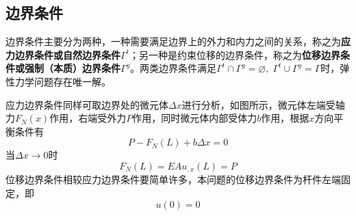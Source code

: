 \subsection{边界条件}
边界条件主要分为两种，一种需要满足边界上的外力和内力之间的关系，称之为\textbf{应力边界条件或自然边界条件}$\Gamma^t$；另一种是约束位移的边界条件，称之为\textbf{位移边界条件或强制（本质）边界条件}$\Gamma^g$。两类边界条件满足$\Gamma^t \cap \Gamma^g = \varnothing,\; \Gamma^t \cup \Gamma^g = \Gamma$时，弹性力学问题存在唯一解。\par
应力边界条件同样可取边界处的微元体$\Delta x$进行分析，如图所示，微元体左端受轴力$F_N(x)$作用，右端受外力$P$作用，同时微元体内部受体力$b$作用，根据$x$方向平衡条件有
\begin{equation}
P - F_N(L) + b \Delta x = 0
\end{equation}
当$\Delta x \rightarrow 0$时
$$
F_N(L) = EAu_{,x}(L) = P
$$
位移边界条件相较应力边界条件要简单许多，本问题的位移边界条件为杆件左端固定，即
\begin{equation}
u(0) = 0
\end{equation}\par

